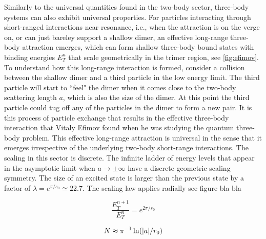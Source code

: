 Similarly to the universal quantities found in the two-body sector, three-body systems can also exhibit universal properties. For particles interacting through short-ranged interactions near resonance, i.e., when the attraction is on the verge on, or can just bareley support a shallow dimer, an effective long-range three-body attraction emerges, which can form shallow three-body bound states with binding energies $E_T^n$ that scale geometrically in the trimer region, see \cref{fig:efimov}. To understand how this long-range interaction is formed, consider a collision between the shallow dimer and a third particle in the low energy limit. The third particle will start to ``feel" the dimer when it comes close to the two-body scattering length $a$, which is also the size of the dimer. At this point the third particle could tug off any of the particles in the dimer to form a new pair. It is this process of particle exchange that results in the effective three-body interaction that Vitaly Efimov found when he was studying the quantum three-body problem. This effective long-range attraction is universal in the sense that it emerges irrespective of the underlying two-body short-range interactions. The scaling in this sector is discrete. The infinite ladder of energy levels that appear in the asymptotic limit when $a \to \pm \infty$ have a discrete geometric scaling symmetry. The size of an excited state is larger than the previous state by a factor of $\lambda = e^{\pi/s_0} \simeq 22.7$. The scaling law applies radially see figure bla bla %

\begin{equation}
\frac{E_T^{n+1}}{E_T^{n}} = e^{2\pi/s_0}
\end{equation}

\begin{equation}
N \approx \pi^{-1} \ln(\lvert a\rvert/r_0)
\end{equation}

